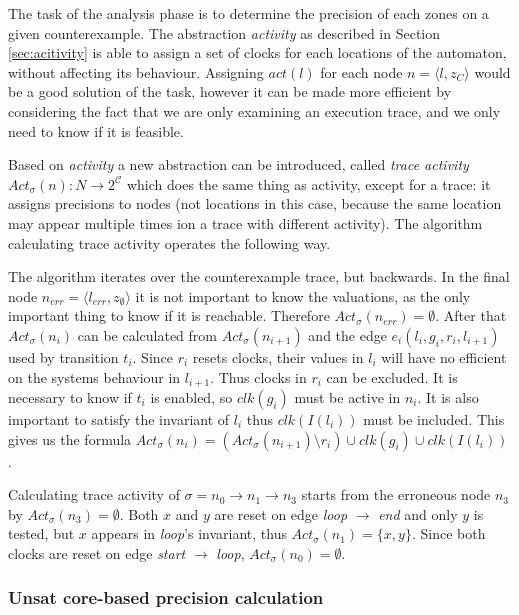 The task of the analysis phase is to determine the precision of each zones on a given counterexample. The abstraction \emph{activity} as described in Section \ref{sec:acitivity} is able to assign a set of clocks for each locations of the automaton, without affecting its behaviour. Assigning $act(l)$ for each node $n=\langle l, z_{C} \rangle$ would be a good solution of the task, however it can be made more efficient by considering the fact that we are only examining an execution trace, and we only need to know if it is feasible.

Based on \emph{activity} a new abstraction can be introduced, called \emph{trace activity} $Act_\sigma(n): N \to 2^\mathcal{C}$ which does the same thing as activity, except for a trace: it assigns precisions to nodes (not locations in this case, because the same location may appear multiple times ion a trace with different activity). The algorithm calculating trace activity operates the following way.

The algorithm iterates over the counterexample trace, but backwards. In the final node  $n_{err}=\langle l_{err}, z_{\emptyset} \rangle$ it is not important to know the valuations, as the only important thing to know if it is reachable. Therefore $Act_\sigma(n_{err})=\emptyset$. After that $Act_\sigma(n_i)$ can be calculated from $Act_\sigma(n_{i+1})$ and the edge $e_i(l_i,g_i,r_i,l_{i+1})$ used by transition $t_i$. Since $r_i$ resets clocks, their values in $l_i$ will have no efficient on the systems behaviour in $l_{i+1}$. Thus clocks in $r_i$ can be excluded. It is necessary to know if $t_i$ is enabled, so $\textit{clk}(g_i)$ must be active in $n_i$. It is also important to satisfy the invariant of $l_i$ thus $\textit{clk}(I(l_i))$ must be included. This gives us the formula $Act_\sigma(n_i)=(Act_\sigma(n_{i+1}) \setminus r_i) \cup \textit{clk}(g_i) \cup \textit{clk}(I(l_i))$. 

\begin{runningExample}
	Calculating trace activity of $\sigma= n_0 \to n_1 \to n_3$ starts from the erroneous node $n_3$ by $Act_\sigma(n_3)=\emptyset$. Both $x$ and $y$ are reset on edge \emph{loop} $\to$ \emph{end} and only $y$ is tested, but $x$ appears in \emph{loop}'s invariant, thus $Act_\sigma(n_1)=\{x,y\}$. Since both clocks are reset on edge \emph{start} $\to$ \emph{loop}, $Act_\sigma(n_0)=\emptyset$.
\end{runningExample}

\subsubsection{Unsat core-based precision calculation}


